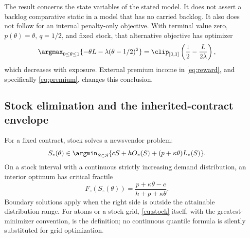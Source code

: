The result concerns the state variables of the stated model. It does not assert a backlog comparative static in a model that has no carried backlog. It also does not follow for an internal penalty-only objective. With terminal value zero, $p(\theta)=\theta$, $q=1/2$, and fixed stock, that alternative objective has optimizer
\begin{equation}\label{eq:penaltycounter}
 \argmax_{0\leq\theta\leq1}\{-\theta L-\lambda(\theta-1/2)^2\}
 =\clip_{[0,1]}\left(\frac12-\frac{L}{2\lambda}\right),
\end{equation}
which decreases with exposure. External premium income in \eqref{eq:reward}, and specifically \eqref{eq:premium}, changes this conclusion.

\subsection{Stock elimination and the inherited-contract envelope}
For a fixed contract, stock solves a newsvendor problem:
\begin{equation}\label{eq:stock}
 S_z(\theta)\in\argmin_{S\in\mathcal S}\{cS+hO_z(S)+(p+\kappa\theta)L_z(S)\}.
\end{equation}
On a stock interval with a continuous strictly increasing demand distribution, an interior optimum has critical fractile
\begin{equation}\label{eq:fractile}
 F_z(S_z(\theta))=\frac{p+\kappa\theta-c}{h+p+\kappa\theta}.
\end{equation}
Boundary solutions apply when the right side is outside the attainable distribution range. For atoms or a stock grid, \eqref{eq:stock} itself, with the greatest-minimizer convention, is the definition; no continuous quantile formula is silently substituted for grid optimization.

